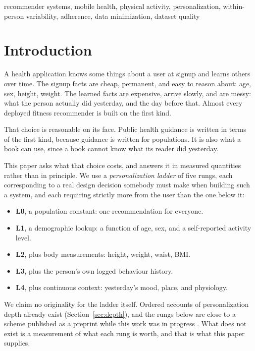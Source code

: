 \documentclass[conference]{IEEEtran}
\begin{document}
\begin{IEEEkeywords}
recommender systems, mobile health, physical activity, personalization, within-person variability, adherence, data minimization, dataset quality
\end{IEEEkeywords}

\section{Introduction}

A health application knows some things about a user at signup and learns others over time. The signup facts are cheap, permanent, and easy to reason about: age, sex, height, weight. The learned facts are expensive, arrive slowly, and are messy: what the person actually did yesterday, and the day before that. Almost every deployed fitness recommender is built on the first kind.

That choice is reasonable on its face. Public health guidance is written in terms of the first kind, because guidance is written for populations. It is also what a book can use, since a book cannot know what its reader did yesterday.

This paper asks what that choice costs, and answers it in measured quantities rather than in principle. We use a \textit{personalization ladder} of five rungs, each corresponding to a real design decision somebody must make when building such a system, and each requiring strictly more from the user than the one below it:

\begin{itemize}
\item \textbf{L0}, a population constant: one recommendation for everyone.
\item \textbf{L1}, a demographic lookup: a function of age, sex, and a self-reported activity level.
\item \textbf{L2}, plus body measurements: height, weight, waist, BMI.
\item \textbf{L3}, plus the person's own logged behaviour history.
\item \textbf{L4}, plus continuous context: yesterday's mood, place, and physiology.
\end{itemize}

We claim no originality for the ladder itself. Ordered accounts of personalization depth already exist (Section~\ref{sec:depth}), and the rungs below are close to a scheme published as a preprint while this work was in progress \cite{abbasian2025pcu}. What does not exist is a measurement of what each rung is worth, and that is what this paper supplies.
\end{document}
